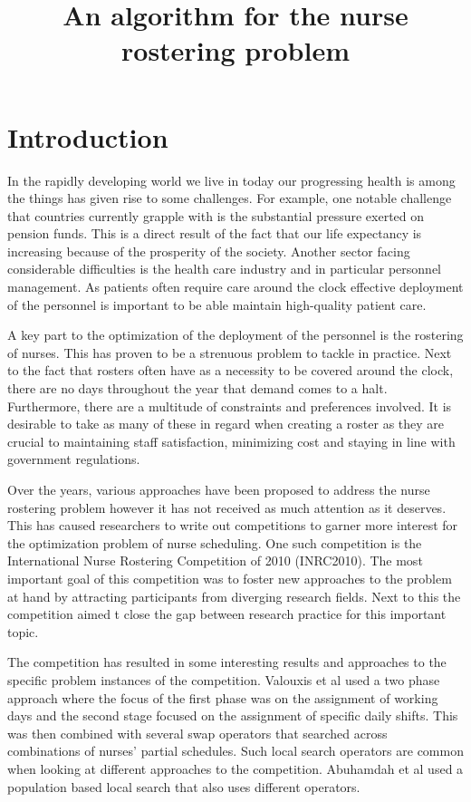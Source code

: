 \documentclass{article}
\title{An algorithm for the nurse rostering problem}
\begin{document}
\maketitle

\section{Introduction}

In the rapidly developing world we live in today our progressing health is among the things has given rise to some challenges. For example, one notable challenge that countries currently grapple with is the substantial pressure exerted on pension funds. This is a direct result of the fact that our life expectancy is increasing because of the prosperity of the society. Another sector facing considerable difficulties is the health care industry and in particular personnel management. As patients often require care around the clock effective deployment of the personnel is important to be able maintain high-quality patient care.

A key part to the optimization of the deployment of the personnel is the rostering of nurses. This has proven to be a strenuous problem to tackle in practice. Next to the fact that rosters often have as a necessity to be covered around the clock, there are no days throughout the year that demand comes to a halt. Furthermore, there are a multitude of constraints and preferences involved. It is desirable to take as many of these in regard when creating a roster as they are crucial to maintaining staff satisfaction, minimizing cost and staying in line with government regulations.

Over the years, various approaches have been proposed to address the nurse rostering problem however it has not received as much attention as it deserves. This has caused researchers to write out competitions to garner more interest for the optimization problem of nurse scheduling. One such competition is the International Nurse Rostering Competition of 2010 (INRC2010). The most important goal of this competition was to foster new approaches to the problem at hand by attracting participants from diverging research fields. Next to this the competition aimed t close the gap between research practice for this important topic.

The competition has resulted in some interesting results and approaches to the specific problem instances of the competition. Valouxis et al used a two phase approach where the focus of the first phase was on the assignment of working days and the second stage focused on the assignment of specific daily shifts. This was then combined with several swap operators that searched across combinations of nurses' partial schedules.
Such local search operators are common when looking at different approaches to the competition. Abuhamdah et al used a population based local search that also uses different operators.
\end{document}
